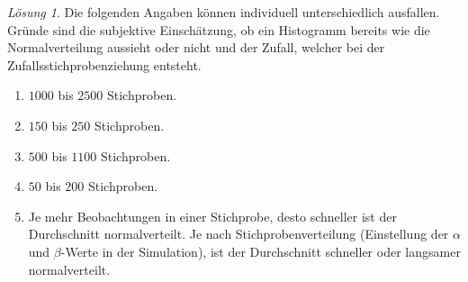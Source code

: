 \documentclass[
]{book}
\providecommand{\tightlist}{%
  \setlength{\itemsep}{0pt}\setlength{\parskip}{0pt}}
\theoremstyle{definition}
\theoremstyle{definition}
\theoremstyle{definition}
\theoremstyle{definition}
\theoremstyle{remark}
\newtheorem*{solution}{Lösung}
\begin{document}
\begin{solution}

Die folgenden Angaben können individuell unterschiedlich ausfallen. Gründe sind die subjektive Einschätzung, ob ein Histogramm bereits wie die Normalverteilung aussieht oder nicht und der Zufall, welcher bei der Zufallsstichprobenziehung entsteht.

\begin{enumerate}
\def\labelenumi{\alph{enumi})}
\tightlist
\item
  \(1000\) bis \(2500\) Stichproben.
\item
  \(150\) bis \(250\) Stichproben.
\item
  \(500\) bis \(1100\) Stichproben.
\item
  \(50\) bis \(200\) Stichproben.
\item
  Je mehr Beobachtungen in einer Stichprobe, desto schneller ist der Durchschnitt normalverteilt. Je nach Stichprobenverteilung (Einstellung der \(\alpha\) und \(\beta\)-Werte in der Simulation), ist der Durchschnitt schneller oder langsamer normalverteilt.
\end{enumerate}

\end{solution}
\end{document}
